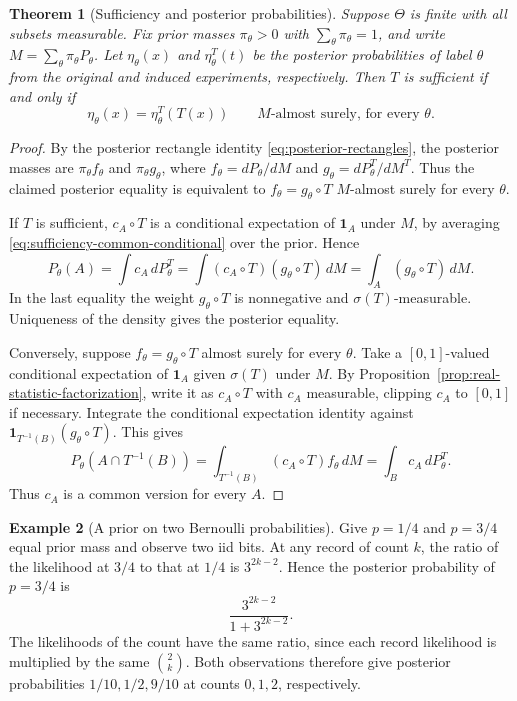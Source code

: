 \documentclass[11pt,oneside]{book}
\newtheorem{theorem}{Theorem}[chapter]
\theoremstyle{definition}
\newtheorem{example}[theorem]{Example}
\theoremstyle{remark}
\begin{document}
\begin{theorem}[Sufficiency and posterior probabilities]
\label{thm:sufficiency-finite-posterior}
Suppose $\Theta$ is finite with all subsets measurable. Fix prior
masses $\pi_\theta>0$ with $\sum_\theta\pi_\theta=1$, and write
$M=\sum_\theta\pi_\theta P_\theta$.
Let $\eta_\theta(x)$ and $\eta_\theta^T(t)$ be the posterior
probabilities of label $\theta$ from the original and induced
experiments, respectively. Then $T$ is sufficient if and only if
\[
\eta_\theta(x)=\eta_\theta^T(T(x))
\qquad M\text{-almost surely, for every }\theta.
\]
\end{theorem}
\begin{proof}
By the posterior rectangle identity
\eqref{eq:posterior-rectangles}, the posterior masses are
$\pi_\theta f_\theta$ and $\pi_\theta g_\theta$, where
$f_\theta=dP_\theta/dM$ and $g_\theta=dP_\theta^T/dM^T$.
Thus the claimed posterior equality is equivalent to
$f_\theta=g_\theta\circ T$ $M$-almost surely for every $\theta$.

If $T$ is sufficient, $c_A\circ T$ is a conditional expectation
of $\mathbf 1_A$ under $M$, by averaging
\eqref{eq:sufficiency-common-conditional} over the prior. Hence
\[
P_\theta(A)=\int c_A\,dP_\theta^T
=\int (c_A\circ T)(g_\theta\circ T)\,dM
=\int_A(g_\theta\circ T)\,dM.
\]
In the last equality the weight $g_\theta\circ T$ is nonnegative
and $\sigma(T)$-measurable. Uniqueness of the density gives the
posterior equality.

Conversely, suppose $f_\theta=g_\theta\circ T$ almost surely
for every $\theta$. Take a $[0,1]$-valued conditional expectation
of $\mathbf 1_A$ given $\sigma(T)$ under $M$. By
Proposition~\ref{prop:real-statistic-factorization}, write it as
$c_A\circ T$ with $c_A$ measurable, clipping $c_A$ to $[0,1]$
if necessary. Integrate the conditional expectation identity
against $\mathbf 1_{T^{-1}(B)}(g_\theta\circ T)$. This gives
\[
P_\theta(A\cap T^{-1}(B))
=\int_{T^{-1}(B)}(c_A\circ T) f_\theta\,dM
=\int_B c_A\,dP_\theta^T .
\]
Thus $c_A$ is a common version for every $A$.
\end{proof}

\begin{example}[A prior on two Bernoulli probabilities]
\label{ex:sufficiency-bernoulli-posterior}
Give $p=1/4$ and $p=3/4$ equal prior mass and observe two iid
bits. At any record of count $k$, the ratio of the likelihood
at $3/4$ to that at $1/4$ is $3^{2k-2}$. Hence the posterior
probability of $p=3/4$ is
\[
\frac{3^{2k-2}}{1+3^{2k-2}}.
\]
The likelihoods of the count have the same ratio, since each
record likelihood is multiplied by the same $\binom{2}{k}$.
Both observations therefore give posterior probabilities
$1/10,1/2,9/10$ at counts $0,1,2$, respectively.
\end{example}
\end{document}
